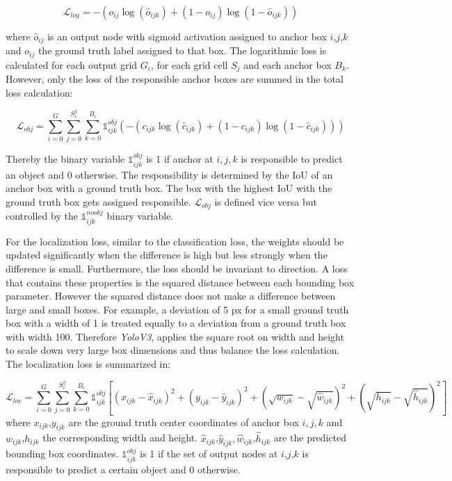 	\begin{equation}
		\mathcal{L}_{log} = -(o_{ij}\log(\hat o_{ijk}) + (1 - o_{ij})\log(1 - \hat o_{ijk}))
	\end{equation}
	
	where $\hat o_{ij}$ is an output node with sigmoid activation assigned to anchor box $i$,$j$,$k$ and $ o_{ij}$ the ground truth label assigned to that box. The logarithmic loss is calculated for each output grid $G_i$, for each grid cell $S_j$ and each anchor box $B_k$. However, only the loss of the responsible anchor boxes are summed in the total loss calculation:
	
	\begin{equation}
		\mathcal{L}_{obj} = \sum_{i=0}^{G}\sum_{j=0}^{S_i^2}\sum_{k=0}^{B_i} \mathbb{1}_{ijk}^{obj}(-(c_{ijk}\log(\hat c_{ijk}) + (1 - c_{ijk})\log(1 - \hat c_{ijk})))
	\end{equation}
	
	Thereby the  binary variable $\mathbb{1}_{ijk}^{obj}$ is 1 if anchor at $i,j,k$ is responsible to predict an object and 0 otherwise. The responsibility is determined by the \ac{IoU} of an anchor box with a ground truth box. The box with the highest \ac{IoU} with the ground truth box gets assigned responsible. $\mathcal{L}_{obj}$ is defined vice versa but controlled by the $\mathbb{1}_{ijk}^{noobj}$ binary variable.

	For the localization loss, similar to the classification loss, the weights should be updated significantly when the difference is high but less strongly when the difference is small. Furthermore, the loss should be invariant to direction. A loss that contains these properties is the squared distance between each bounding box parameter. However the squared distance does not make a difference between large and small boxes. For example, a deviation of 5 px for a small ground truth box with a width of 1 is treated equally to a deviation from a ground truth box with width 100. Therefore \textit{YoloV3}, applies the square root on width and height to scale down very large box dimensions and thus balance the loss calculation. The localization loss is summarized in:
	
	\begin{equation}
		\mathcal{L}_{loc} = \sum_{i=0}^{G} \sum_{j=0}^{S_i^2}\sum_{k=0}^{B_i} \mathbb{1}_{ijk}^{obj}[(x_{ijk}-\hat{x}_{ijk})^2 + (y_{ijk}-\hat{y}_{ijk})^2  + (\sqrt{w_{ijk}}-\sqrt{\hat{w}_{ijk}})^2 +(\sqrt{h_{ijk}}-\sqrt{\hat{h}_{ijk}})^2 ]
	\end{equation}
	where $x_{ijk}$,$y_{ijk}$ are the ground truth center coordinates of anchor box $i,j,k$ and $w_{ijk}$,$h_{ijk}$ the corresponding width and height. $\hat x_{ijk}$,$\hat y_{ijk}, \hat w_{ijk}$,$\hat h_{ijk}$ are the predicted bounding box coordinates. $\mathbb{1}_{ijk}^{obj}$ is 1 if the set of output nodes at $i$,$j$,$k$ is responsible to predict a certain object and 0 otherwise. 
	
